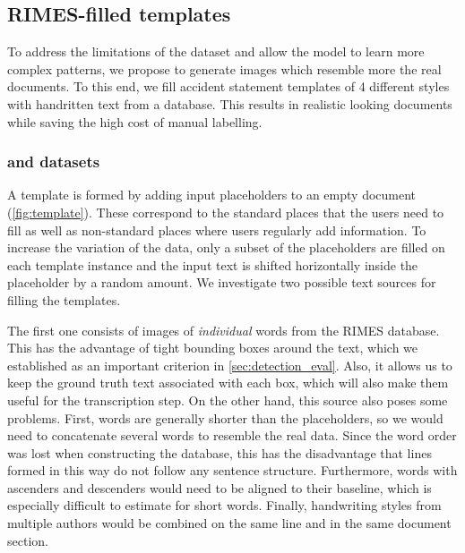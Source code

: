 
	\subsection{RIMES-filled templates}

			To address the limitations of the  dataset and allow the model to learn more complex patterns, we propose to generate images which resemble more the real documents. To this end, we fill accident statement templates of 4 different styles with handritten text from a database. This results in realistic looking documents while saving the high cost of manual labelling.


		\subsubsection*{ and  datasets}\label{sec:rimes_template}
			A template is formed by adding input placeholders to an empty document (\autoref{fig:template}). These correspond to the standard places that the users need to fill as well as non-standard places where users regularly add information. To increase the variation of the data, only a subset of the placeholders are filled on each template instance and the input text is shifted horizontally inside the placeholder by a random amount. We investigate two possible text sources for filling the templates.

			The first one consists of images of \emph{individual} words from the RIMES database. This has the advantage of tight bounding boxes around the text, which we established as an important criterion in \autoref{sec:detection_eval}. Also, it allows us to keep the ground truth text associated with each box, which will also make them useful for the transcription step. On the other hand, this source also poses some problems. First, words are generally shorter than the placeholders, so we would need to concatenate several words to resemble the real data. Since the word order was lost when constructing the database, this has the disadvantage that lines formed in this way do not follow any sentence structure. Furthermore, words with ascenders and descenders would need to be aligned to their baseline, which is especially difficult to estimate for short words. Finally, handwriting styles from multiple authors would be combined on the same line and in the same document section.

